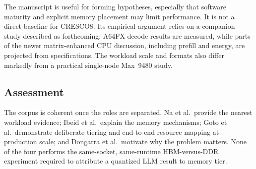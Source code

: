 The manuscript is useful for forming hypotheses, especially that
software maturity and explicit memory placement may limit performance.
It is not a direct baseline for CRESCO8.  Its empirical argument relies
on a companion study described as forthcoming: A64FX decode results are
measured, while parts of the newer matrix-enhanced CPU discussion,
including prefill and energy, are projected from specifications.  The
workload scale and formats also differ markedly from a practical
single-node Max~9480 study.

\subsection{Assessment}

The corpus is coherent once the roles are separated.  Na et al.\ provide
the nearest workload evidence; Ibeid et al.\ explain the memory
mechanisms; Goto et al.\ demonstrate deliberate tiering and end-to-end
resource mapping at production scale; and Dongarra et al.\ motivate why
the problem matters.  None of the four performs the same-socket,
same-runtime HBM-versus-DDR experiment required to attribute a
quantized LLM result to memory tier.
